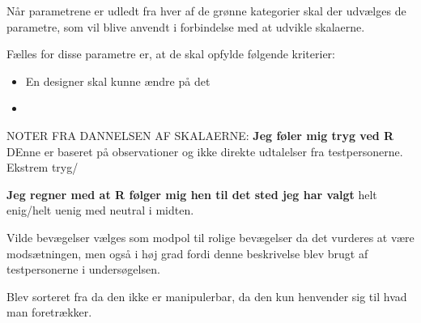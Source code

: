





Når parametrene er udledt fra hver af de grønne kategorier skal der udvælges de parametre, som vil blive anvendt i forbindelse med at udvikle skalaerne. 

Fælles for disse parametre er, at de skal opfylde følgende kriterier: \blankline
%
\begin{itemize}
  \item En designer skal kunne ændre på det
  \item 
\end{itemize}



NOTER FRA DANNELSEN AF SKALAERNE:
\textbf{Jeg føler mig tryg ved R}
DEnne er baseret på observationer og ikke direkte udtalelser fra testpersonerne. 
Ekstrem tryg/

\textbf{Jeg regner med at R følger mig hen til det sted jeg har valgt} 
helt enig/helt uenig med neutral i midten. 

Vilde bevægelser vælges som modpol til rolige bevægelser da det vurderes at være modsætningen, men også i høj grad fordi denne beskrivelse blev brugt af testpersonerne i undersøgelsen. 

Blev sorteret fra da den ikke er manipulerbar, da den kun henvender sig til hvad man foretrækker. \blankline



